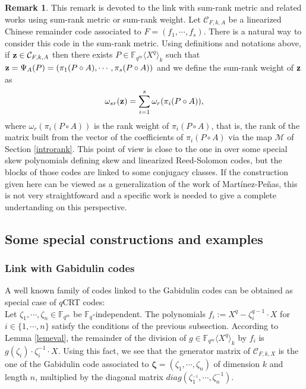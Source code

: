 \documentclass{article}
\newcommand{\tmop}[1]{#1}          %
\newcommand{\QP}{\mathbb{F}_{q^m} \langle X^q \rangle}
\theoremstyle{definition}
\newtheorem{remark}{Remark}
\begin{document}
\begin{remark}
      This remark is devoted to the link with sum-rank metric and related works using sum-rank metric or sum-rank weight. Let $\mathcal{C}_{F,k,A}$ be a linearized Chinese remainder code associated to $F=(f_1,\cdots,f_s)$. There is a natural way to consider this code in the sum-rank metric. Using definitions and notations above, if ${\bf z} \in  \mathcal{C}_{F,k,A}$ then there exists $P\in \QP_k$ such that ${\bf {z}}=\Psi_A(P) = (\pi_1(P \circ A),\cdots,\pi_s(P \circ A))$ and we define the sum-rank weight of ${\bf z}$ as $$\omega_{sr}({\bf{z}})=\displaystyle \sum_{i=1}^{s} \omega_r(\pi_i(P \circ A)),$$ where $\omega_r(\pi_i(P \circ A))$ is the rank weight of $\pi_i(P \circ A)$, that is, the rank of the matrix built from the vector of the coefficients of $\pi_i(P \circ A)$ via the map $\mathcal{M}$ of Section \ref{introrank}.
      This point of view is close to the one in \cite{martinez-penas_2018} over some special skew polynomials defining skew and linearized Reed-Solomon codes, but the blocks of those codes are linked to some conjugacy classes. If the construction given here can be viewed as a generalization of the work of Mart\'{i}nez-Pe\~{n}as, this is not very straightfoward and a specific work is needed to give a complete undertanding on this perspective.
\end{remark}
\color{black}

\subsection{Some special constructions and examples}
\subsubsection{Link with Gabidulin codes}

A well known family of codes linked to the Gabidulin codes can be obtained as special
case of $q$CRT codes: \\
Let $\zeta_1, \cdots, \zeta_n \in \mathbb{F}_{q^m}$ be
$\mathbb{F}_q$-independent. The polynomials $f_i := X^q -
      \zeta_i^{q - 1} \cdot X$ for $i \in \{ 1, \cdots, n \}$ satisfy the conditions
of the previous subsection. According to Lemma \ref{lemeval}, the
remainder of the division of $g \in \mathbb{F}_{q^m} \langle X^q
      \rangle_k$ by $f_i$ is $g (\zeta_i) \cdot \zeta_i^{- 1} \cdot X$. Using this
fact, we see that the generator matrix of $\mathcal{C}_{F, k,X}$ is the one of the
Gabidulin code associated to $\mathbf{\zeta} = (\zeta_1, \cdots, \zeta_n)$ of dimension $k$ and
length $n$, multiplied by the diagonal matrix $\tmop{diag} (\zeta_1^{_{- 1}},
      \cdots, \zeta_n^{- 1})$. \\
\end{document}
